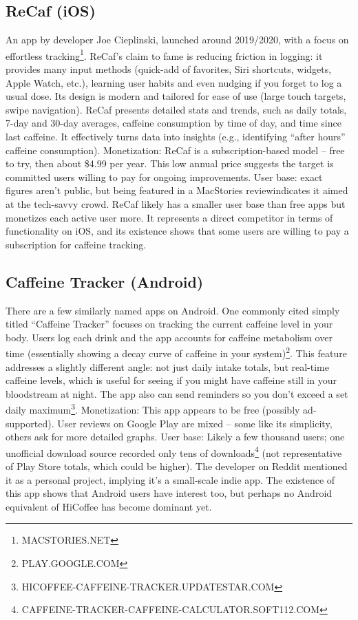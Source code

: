 \documentclass{article}
\begin{document}
\subsection{ReCaf (iOS)}
An app by developer Joe Cieplinski, launched around 2019/2020, with a focus on effortless tracking\footnote{MACSTORIES.NET}. ReCaf’s claim to fame is reducing friction in logging: it provides many input methods (quick-add of favorites, Siri shortcuts, widgets, Apple Watch, etc.), learning user habits and even nudging if you forget to log a usual dose\footnotemark[2]. Its design is modern and tailored for ease of use (large touch targets, swipe navigation)\footnotemark[2]. ReCaf presents detailed stats and trends, such as daily totals, 7-day and 30-day averages, caffeine consumption by time of day, and time since last caffeine\footnotemark[2, 7]. It effectively turns data into insights (e.g., identifying “after hours” caffeine consumption). Monetization: ReCaf is a subscription-based model – free to try, then about \$4.99 per year\footnotemark[2]. This low annual price suggests the target is committed users willing to pay for ongoing improvements. User base: exact figures aren’t public, but being featured in a MacStories review\footnotemark[2] indicates it aimed at the tech-savvy crowd. ReCaf likely has a smaller user base than free apps but monetizes each active user more. It represents a direct competitor in terms of functionality on iOS, and its existence shows that some users are willing to pay a subscription for caffeine tracking.

\subsection{Caffeine Tracker (Android)}
There are a few similarly named apps on Android. One commonly cited simply titled “Caffeine Tracker” focuses on tracking the current caffeine level in your body. Users log each drink and the app accounts for caffeine metabolism over time (essentially showing a decay curve of caffeine in your system)\footnote{PLAY.GOOGLE.COM}. This feature addresses a slightly different angle: not just daily intake totals, but real-time caffeine levels, which is useful for seeing if you might have caffeine still in your bloodstream at night. The app also can send reminders so you don’t exceed a set daily maximum\footnote{HICOFFEE-CAFFEINE-TRACKER.UPDATESTAR.COM}. Monetization: This app appears to be free (possibly ad-supported). User reviews on Google Play are mixed – some like its simplicity, others ask for more detailed graphs\footnotemark[4]. User base: Likely a few thousand users; one unofficial download source recorded only tens of downloads\footnote{CAFFEINE-TRACKER-CAFFEINE-CALCULATOR.SOFT112.COM} (not representative of Play Store totals, which could be higher). The developer on Reddit mentioned it as a personal project, implying it’s a small-scale indie app. The existence of this app shows that Android users have interest too, but perhaps no Android equivalent of HiCoffee has become dominant yet.
\end{document}
